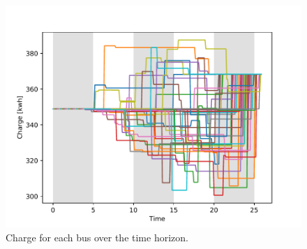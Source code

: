 \documentclass[letterpaper, 10pt, conference]{IEEEtran}
\begin{document}
\begin{figure}[ht]
	\centering
	\includegraphics[trim=0in 0in 0in 0in, width=\linewidth]{charges.pdf}
	\caption{Charge for each bus over the time horizon.}
	\label{fig:charges}
\end{figure}
\end{document}
